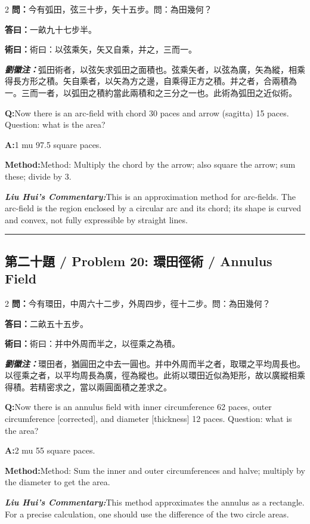 \documentclass[11pt,a4paper]{article}
\newcommand{\cnwen}{\textcolor{cnlabelfg}{\textbf{問：}}}
\newcommand{\cnda}{\textbf{答曰：}}
\newcommand{\cnshu}{\textcolor{cnlabelfg}{\textbf{術曰：}}}
\newcommand{\cnzhu}{\textcolor{commentarycolor}{\textit{\textbf{劉徽注：}}}}
\newcommand{\enwen}{\textcolor{enlabelfg}{\textbf{Q:}}}
\newcommand{\enda}{\textcolor{enlabelfg}{\textbf{A:}}}
\newcommand{\enshu}{\textcolor{enlabelfg}{\textbf{Method:}}}
\newcommand{\enzhu}{\textcolor{enlabelfg}{\textit{\textbf{Liu Hui's Commentary:}}}}
\begin{document}
\begin{paracol}{2}
\switchcolumn[0]
\cnwen 今有弧田，弦三十步，矢十五步。問：為田幾何？

\cnda 一畝九十七步半。

\cnshu 術曰：以弦乘矢，矢又自乘，并之，三而一。

\cnzhu 弧田術者，以弦矢求弧田之面積也。弦乘矢者，以弦為廣，矢為縱，相乘得長方形之積。矢自乘者，以矢為方之邊，自乘得正方之積。并之者，合兩積為一。三而一者，以弧田之積約當此兩積和之三分之一也。此術為弧田之近似術。

\switchcolumn[1]
\enwen Now there is an arc-field with chord 30 paces and arrow (sagitta) 15 paces. Question: what is the area?

\enda 1 mu 97.5 square paces.

\enshu Method: Multiply the chord by the arrow; also square the arrow; sum these; divide by 3.

\enzhu This is an approximation method for arc-fields. The arc-field is the region enclosed by a circular arc and its chord; its shape is curved and convex, not fully expressible by straight lines.
\end{paracol}

\bigskip\hrule\bigskip

\subsection{第二十題 / Problem 20: 環田徑術 / Annulus Field}

\begin{paracol}{2}
\switchcolumn[0]
\cnwen 今有環田，中周六十二步，外周四步，徑十二步。問：為田幾何？

\cnda 二畝五十五步。

\cnshu 術曰：并中外周而半之，以徑乘之為積。

\cnzhu 環田者，猶圓田之中去一圓也。并中外周而半之者，取環之平均周長也。以徑乘之者，以平均周長為廣，徑為縱也。此術以環田近似為矩形，故以廣縱相乘得積。若精密求之，當以兩圓面積之差求之。

\switchcolumn[1]
\enwen Now there is an annulus field with inner circumference 62 paces, outer circumference [corrected], and diameter [thickness] 12 paces. Question: what is the area?

\enda 2 mu 55 square paces.

\enshu Method: Sum the inner and outer circumferences and halve; multiply by the diameter to get the area.

\enzhu This method approximates the annulus as a rectangle. For a precise calculation, one should use the difference of the two circle areas.
\end{paracol}
\end{document}
